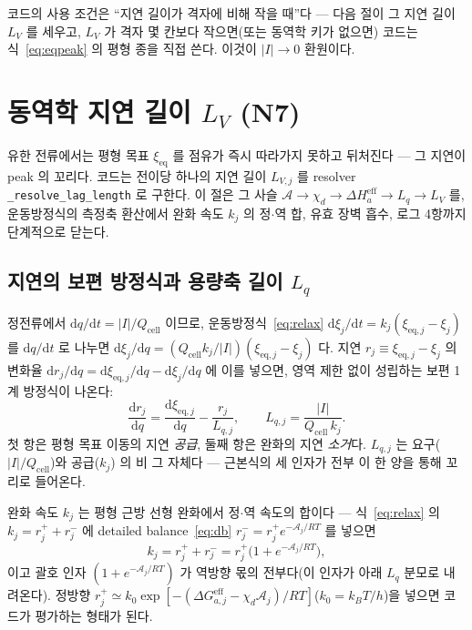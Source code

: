 \documentclass[11pt,a4paper]{article}
\newcommand{\dd}{\mathrm{d}}
\newcommand{\eff}{\mathrm{eff}}
\newcommand{\eq}{\mathrm{eq}}
\newcommand{\cell}{\mathrm{cell}}
\newcommand{\code}[1]{\texttt{#1}}
\begin{document}
코드의 사용 조건은 ``지연 길이가 격자에 비해 작을 때''다 — 다음 절이 그 지연 길이 $L_V$ 를 세우고, $L_V$ 가 격자
몇 칸보다 작으면(또는 동역학 키가 없으면) 코드는 식~\eqref{eq:eqpeak} 의 평형 종을 직접 쓴다. 이것이 $|I|\to0$ 환원이다.

\section{동역학 지연 길이 $L_V$ (N7)}\label{sec:lag}
유한 전류에서는 평형 목표 $\xi_\eq$ 를 점유가 즉시 따라가지 못하고 뒤처진다 — 그 지연이 peak 의 꼬리다. 코드는 전이당
하나의 지연 길이 $L_{V,j}$ 를 resolver \code{\_resolve\_lag\_length} 로 구한다. 이 절은 그 사슬
$\mathcal A\to\chi_d\to\Delta H_a^\eff\to L_q\to L_V$ 를, 운동방정식의 측정축 환산에서 완화 속도 $k_j$ 의 정$\cdot$역 합,
유효 장벽 흡수, 로그 4항까지 단계적으로 닫는다.

\subsection{지연의 보편 방정식과 용량축 길이 $L_q$}
정전류에서 $\dd q/\dd t=|I|/Q_\cell$ 이므로, 운동방정식~\eqref{eq:relax} $\dd\xi_j/\dd t=k_j(\xi_{\eq,j}-\xi_j)$ 를
$\dd q/\dd t$ 로 나누면 $\dd\xi_j/\dd q=(Q_\cell k_j/|I|)(\xi_{\eq,j}-\xi_j)$ 다. 지연 $r_j\equiv\xi_{\eq,j}-\xi_j$ 의
변화율 $\dd r_j/\dd q=\dd\xi_{\eq,j}/\dd q-\dd\xi_j/\dd q$ 에 이를 넣으면, 영역 제한 없이 성립하는 보편 1계 방정식이 나온다:
\begin{equation}
\frac{\dd r_j}{\dd q}=\frac{\dd\xi_{\eq,j}}{\dd q}-\frac{r_j}{L_{q,j}},
\qquad L_{q,j}=\frac{|I|}{Q_\cell\,k_j}.
\label{eq:Lq}
\end{equation}
첫 항은 평형 목표 이동의 지연 \emph{공급}, 둘째 항은 완화의 지연 \emph{소거}다. $L_{q,j}$ 는 요구($|I|/Q_\cell$)와
공급($k_j$) 의 비 그 자체다 — 근본식의 세 인자가 전부 이 한 양을 통해 꼬리로 들어온다.

완화 속도 $k_j$ 는 평형 근방 선형 완화에서 정$\cdot$역 속도의 합이다 — 식~\eqref{eq:relax} 의 $k_j=r_j^++r_j^-$ 에
detailed balance~\eqref{eq:db} $r_j^-=r_j^+e^{-\mathcal A_j/RT}$ 를 넣으면
\begin{equation}
k_j=r_j^++r_j^-=r_j^+\big(1+e^{-\mathcal A_j/RT}\big),
\label{eq:kuniv}
\end{equation}
이고 괄호 인자 $(1+e^{-\mathcal A_j/RT})$ 가 역방향 몫의 전부다(이 인자가 아래 $L_q$ 분모로 내려온다). 정방향
$r_j^+\simeq k_0\exp[-(\Delta G_{a,j}^\eff-\chi_d\mathcal A_j)/RT]$($k_0=k_BT/h$)을 넣으면 코드가 평가하는 형태가 된다.
\end{document}
